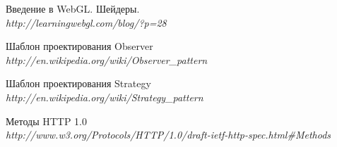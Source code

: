 \documentclass[14pt, a4paper]{extarticle}
\begin{document}
\begin{thebibliography}{9}
  Введение в WebGL. Шейдеры. \\
  \emph{http://learningwebgl.com/blog/?p=28}

  Шаблон проектирования Observer \\
  \emph{http://en.wikipedia.org/wiki/Observer\_pattern}

  Шаблон проектирования Strategy \\
  \emph{http://en.wikipedia.org/wiki/Strategy\_pattern}

  Методы HTTP 1.0 \\
  \emph{http://www.w3.org/Protocols/HTTP/1.0/draft-ietf-http-spec.html\#Methods }

\end{thebibliography}
\end{document}
